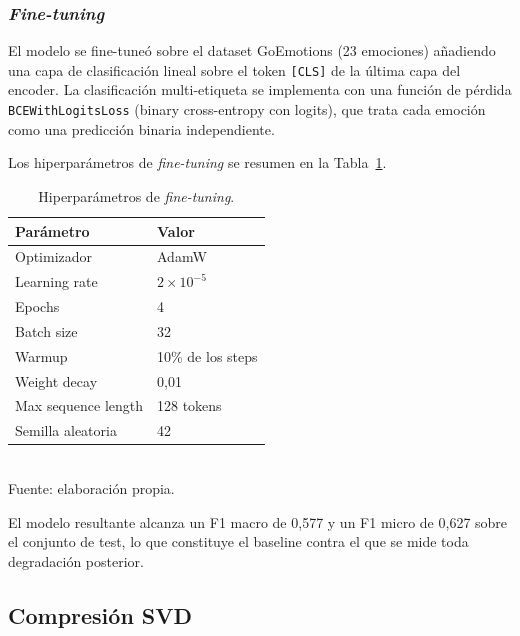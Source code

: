 \subsubsection{\emph{Fine-tuning}}

El modelo se fine-tuneó sobre el dataset GoEmotions (23 emociones) añadiendo una capa
de clasificación lineal sobre el token \texttt{[CLS]} de la última capa del encoder.
La clasificación multi-etiqueta se implementa con una función de pérdida
\texttt{BCEWithLogitsLoss} (binary cross-entropy con logits), que trata cada emoción
como una predicción binaria independiente.

Los hiperparámetros de \emph{fine-tuning} se resumen en la Tabla~\ref{tab:hyperparams}.

\begin{table}[H]
    \centering
    \caption{Hiperparámetros de \emph{fine-tuning}.}
    \label{tab:hyperparams}
    \small
    \begin{tabular}{@{}l l@{}}
        \toprule
        Parámetro & Valor \\
        \midrule
        Optimizador        & AdamW \\
        Learning rate      & $2 \times 10^{-5}$ \\
        Epochs             & 4 \\
        Batch size         & 32 \\
        Warmup             & 10\% de los steps \\
        Weight decay       & 0{,}01 \\
        Max sequence length & 128 tokens \\
        Semilla aleatoria  & 42 \\
        \bottomrule
    \end{tabular}
    \\[0.15cm]{\small Fuente: elaboración propia.}
\end{table}

El modelo resultante alcanza un F1 macro de 0{,}577 y un F1 micro de 0{,}627 sobre
el conjunto de test, lo que constituye el baseline contra el que se mide toda
degradación posterior.

\subsection{Compresión SVD}
\label{sec:met-svd}

